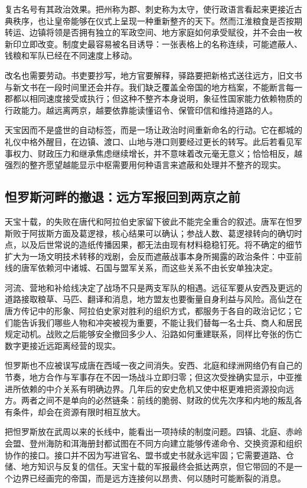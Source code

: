 复古名号有其政治效果。把州称为郡、刺史称为太守，使行政语言看起来更接近古典秩序，也让皇帝能够在仪式上呈现一种重新整齐的天下。然而江淮粮食是否按期转运、边镇将领是否拥有独立的军政空间、地方家庭如何承受赋役，并不会由一枚新印立即改变。制度史最容易被名目诱导：一张表格上的名称连续，可能遮蔽人、钱粮和军队已经在不同速度上移动。

改名也需要劳动。书吏要抄写，地方官要解释，驿路要把新格式送往远方，旧文书与新文书在一段时间里还会并存。我们缺乏覆盖全帝国的地方档案，不能断言每一郡都以相同速度接受或执行；但这种不整齐本身说明，象征性国家能力依赖物质的行政能力。越远离两京，越要依靠能读懂诏令、保管印信和维持道路的人。

天宝因而不是盛世的自动标签，而是一场让政治时间重新命名的行动。它在都城的礼仪中格外醒目，在边镇、渡口、山地与港口则要经过更长的转写。此后若看见军事权力、财政压力和继承焦虑继续增长，并不意味着改元毫无意义；恰恰相反，越强烈的整齐愿望越能显示中枢需要用何种语言来遮蔽和处理并不整齐的现实。

\subsection{怛罗斯河畔的撤退：远方军报回到两京之前}
天宝十载，的失败在唐代和阿拉伯史家留下彼此不能完全重合的叙述。唐军在怛罗斯败于阿拔斯方面及葛逻禄，核心结果可以确认；参战人数、葛逻禄转向的确切时点，以及后世常说的造纸传播因果，都无法由现有材料稳稳钉死。将不确定的细节扩大为一场文明技术转移的戏剧，会反而遮蔽战事本身所揭露的政治条件：中亚前线的唐军依赖河中诸城、石国与盟军关系，而这些关系不由长安单独决定。

河流、营地和补给线决定了战场不只是两支军队的相遇。远征军要从安西及更远的道路接取粮草、马匹、翻译和消息，地方盟友也要衡量自身利益与风险。高仙芝在唐方传记中的形象、阿拉伯史家对胜利的组织方式，都服务于各自的政治记忆；它们能告诉我们哪些人物和冲突被视为重要，不能让我们替每一名士兵、商人和居民规定动机。战败之后能够安全撤回多少人、沿路如何重建联系，同样比夸张的伤亡数字更接近远距离经营的现实。

怛罗斯也不应被误写成唐在西域一夜之间消失。安西、北庭和绿洲网络仍有自己的节奏，地方合作与军事存在不因一场战斗立即归零；但这次受挫确实显示，中亚推进所依赖的中介关系有明确边界。几年后的安史危机又使中枢更难把资源投向远方。两者之间不是单向的必然链条：前线的脆弱、财政的优先次序和内地的叛乱各有条件，却会在资源有限时相互放大。

把怛罗斯放在武周以来的长线中，能看出一项持续的制度问题。四镇、北庭、赤岭会盟、登州海防和洱海册封都试图在不同方向建立能够传递命令、交换资源和组织协作的接口。接口并不因为写进官名、盟书或史书就永远牢固；它需要道路、仓储、地方知识与反复的信任。天宝十载的军报最终会抵达两京，但它带回的不是一个边界已经画完的帝国，而是远方连接何以昂贵、何以随时可能断裂的消息。
